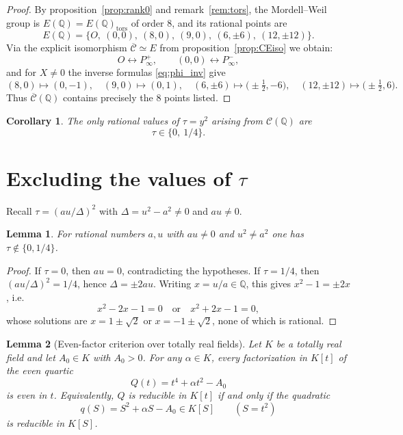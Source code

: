 \documentclass[12pt]{article}
\newtheorem{lemma}{Lemma}
\newtheorem{corollary}{Corollary}
\theoremstyle{remark}
\theoremstyle{definition}
\begin{document}
\begin{proof}
By proposition~\ref{prop:rank0} and remark~\ref{rem:tors}, the Mordell--Weil group is
$E(\mathbb{Q})=E(\mathbb{Q})_{\mathrm{tors}}$ of order $8$, and its rational points are
\[
E(\mathbb{Q})=\{O,\ (0,0),\ (8,0),\ (9,0),\ (6,\pm6),\ (12,\pm12)\}.
\]
Via the explicit isomorphism $\overline{\mathcal{C}}\simeq E$ from proposition~\ref{prop:CEiso} we obtain:
\[
O\longleftrightarrow P_\infty^+,\qquad (0,0)\longleftrightarrow P_\infty^-,
\]
and for $X\neq0$ the inverse formulas \eqref{eq:phi_inv} give
\[
(8,0)\mapsto (0,-1),\quad (9,0)\mapsto(0,1),\quad
(6,\pm6)\mapsto\bigl(\pm\tfrac12,-6\bigr),\quad
(12,\pm12)\mapsto\bigl(\pm\tfrac12,6\bigr).
\]
Thus $\overline{\mathcal{C}}(\mathbb{Q})$ contains precisely the $8$ points listed.
\end{proof}

\begin{corollary}\label{cor:taus}
The only rational values of $\tau=y^2$ arising from $\mathcal{C}(\mathbb{Q})$ are
\[
\tau\in\{0,\ 1/4\}.
\]
\end{corollary}


\section{Excluding the values of \texorpdfstring{$\tau$}{tau}}\label{sec:tau}
Recall $\tau=(au/\Delta)^2$ with $\Delta=u^2-a^2\neq0$ and $au\neq0$.

\begin{lemma}\label{lem:tau}
For rational numbers $a,u$ with $au\neq0$ and $u^2\neq a^2$ one has $\tau\notin\{0,1/4\}$.
\end{lemma}

\begin{proof}
If $\tau=0$, then $au=0$, contradicting the hypotheses.
If $\tau=1/4$, then $(au/\Delta)^2=1/4$, hence $\Delta=\pm 2au$.
Writing $x=u/a\in\mathbb{Q}$, this gives $x^2-1=\pm 2x$, i.e.
\[
x^2-2x-1=0\quad\text{or}\quad x^2+2x-1=0,
\]
whose solutions are $x=1\pm\sqrt2$ or $x=-1\pm\sqrt2$, none of which is rational.
\end{proof}

\begin{lemma}[Even-factor criterion over totally real fields]\label{lem:even}
Let $K$ be a totally real field and let $A_0\in K$ with $A_0>0$.
For any $\alpha\in K$, every factorization in $K[t]$ of the even quartic
\[
Q(t)=t^4+\alpha t^2-A_0
\]
is even in $t$. Equivalently, $Q$ is reducible in $K[t]$ if and only if the quadratic
\[
q(S)=S^2+\alpha S-A_0\in K[S]\qquad(S=t^2)
\]
is reducible in $K[S]$.
\end{lemma}
\end{document}
